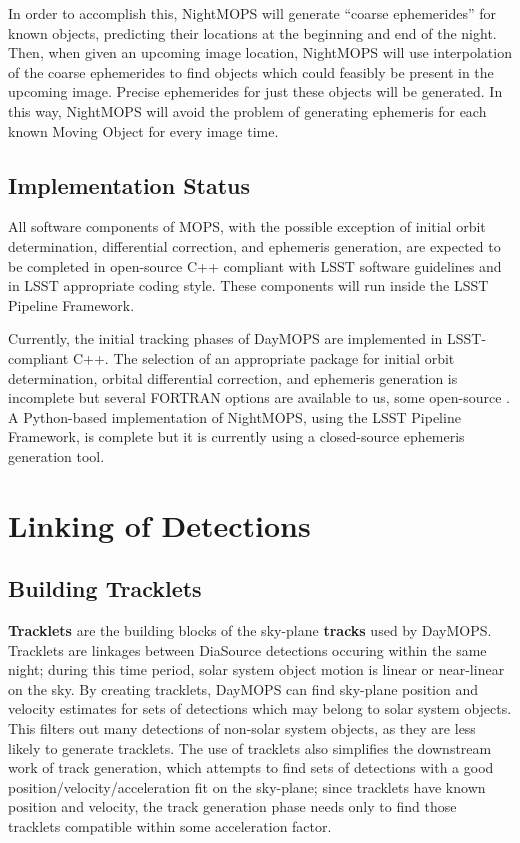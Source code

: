 \documentclass[12pt,preprint]{aastex}
\begin{document}

In order to accomplish this, NightMOPS will generate ``coarse
ephemerides'' for known objects, predicting their locations at the
beginning and end of the night.  Then, when given an upcoming image
location, NightMOPS will use interpolation of the coarse ephemerides
to find objects which could feasibly be present in the upcoming
image. Precise ephemerides for just these objects will be
generated. In this way, NightMOPS will avoid the problem of generating
ephemeris for each known Moving Object for every image time.


\subsection{Implementation Status}

All software components of MOPS, with the possible exception of
initial orbit determination, differential correction, and ephemeris
generation, are expected to be completed in open-source C++ compliant
with LSST software guidelines and in LSST appropriate coding style.
These components will run inside the LSST Pipeline Framework.

Currently, the initial tracking phases of DayMOPS are implemented in
LSST-compliant C++.  The selection of an appropriate package for
initial orbit determination, orbital differential correction, and
ephemeris generation is incomplete but several FORTRAN options are
available to us, some open-source \citep{Milani2006}
\citep{OpenOrb2009}.  A Python-based implementation of NightMOPS,
using the LSST Pipeline Framework, is complete but it is currently
using a closed-source ephemeris generation tool.



\section{Linking of Detections}
\label{linking}



\subsection{Building Tracklets}


\textbf{Tracklets} are the building blocks of the sky-plane
\textbf{tracks} used by DayMOPS.  Tracklets are linkages between
DiaSource detections occuring within the same night; during this time
period, solar system object motion is linear or near-linear on the
sky. By creating tracklets, DayMOPS can find sky-plane position and
velocity estimates for sets of detections which may belong to solar
system objects.  This filters out many detections of non-solar system
objects, as they are less likely to generate tracklets.  The use of
tracklets also simplifies the downstream work of track generation,
which attempts to find sets of detections with a good
position/velocity/acceleration fit on the sky-plane; since tracklets
have known position and velocity, the track generation phase needs
only to find those tracklets compatible within some acceleration
factor.
\end{document}
